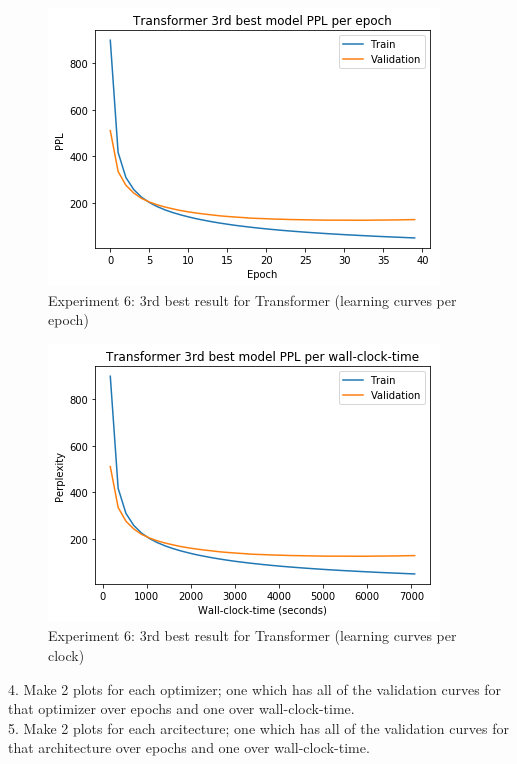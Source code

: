 \begin{itemize}
\begin{figure}[H]
	\centering
	\includegraphics[scale=0.8]{Q4-3_TR_3epoch.png}
	\caption{Experiment 6: 3rd best result for Transformer (learning curves per epoch)}
	\label{fig:fig22TR}
\end{figure}
\begin{figure}[H]
	\centering
	\includegraphics[scale=0.8]{Q4-3_TR_3time.png}
	\caption{Experiment 6: 3rd best result for Transformer (learning curves per clock)}
	\label{fig:fig22bTR}
\end{figure}

\end{itemize}
4. Make 2 plots for each optimizer; one which has all of the validation curves for that optimizer
over epochs and one over wall-clock-time.\\
5. Make 2 plots for each arcitecture; one which has all of the validation curves for that architecture
over epochs and one over wall-clock-time.

